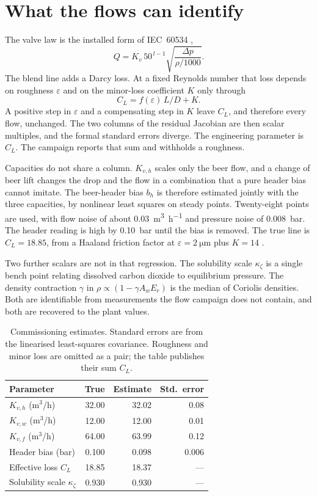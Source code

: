 \documentclass[11pt,a4paper]{article}
\begin{document}
\section{What the flows can identify}
The valve law is the installed form of IEC~60534 \citep{iec60534},
\begin{equation}
Q = K_v\,50^{\,l-1}\sqrt{\frac{\Delta p}{\rho/1000}}.
\end{equation}
The blend line adds a Darcy loss. At a fixed Reynolds number that loss depends on roughness $\varepsilon$ and on the minor-loss coefficient $K$ only through
\begin{equation}
C_L = f(\varepsilon)\,L/D + K.
\end{equation}
A positive step in $\varepsilon$ and a compensating step in $K$ leave $C_L$, and therefore every flow, unchanged. The two columns of the residual Jacobian are then scalar multiples, and the formal standard errors diverge. The engineering parameter is $C_L$. The campaign reports that sum and withholds a roughness.

Capacities do not share a column. $K_{v,h}$ scales only the beer flow, and a change of beer lift changes the drop and the flow in a combination that a pure header bias cannot imitate. The beer-header bias $b_h$ is therefore estimated jointly with the three capacities, by nonlinear least squares on steady points. Twenty-eight points are used, with flow noise of about \SI{0.03}{\cubic\metre\per\hour} and pressure noise of \SI{0.008}{bar}. The header reading is high by \SI{0.10}{bar} until the bias is removed. The true line is $C_L=18.85$, from a Haaland friction factor at $\varepsilon=\SI{2}{\micro\metre}$ plus $K=14$ \citep{crane2009}.

Two further scalars are not in that regression. The solubility scale $\kappa_\zeta$ is a single bench point relating dissolved carbon dioxide to equilibrium pressure. The density contraction $\gamma$ in $\rho\propto(1-\gamma A_w E_r)$ is the median of Coriolis densities. Both are identifiable from measurements the flow campaign does not contain, and both are recovered to the plant values.

\begin{table}[t]
\centering
\caption{Commissioning estimates. Standard errors are from the linearised least-squares covariance. Roughness and minor loss are omitted as a pair; the table publishes their sum $C_L$.}
\label{tab:est}
\begin{tabular}{lrrr}
\toprule
Parameter & True & Estimate & Std.\ error \\
\midrule
$K_{v,h}$ (m$^3$/h) & 32.00 & 32.02 & 0.08 \\
$K_{v,w}$ (m$^3$/h) & 12.00 & 12.00 & 0.01 \\
$K_{v,f}$ (m$^3$/h) & 64.00 & 63.99 & 0.12 \\
Header bias (bar) & 0.100 & 0.098 & 0.006 \\
Effective loss $C_L$ & 18.85 & 18.37 & --- \\
Solubility scale $\kappa_\zeta$ & 0.930 & 0.930 & --- \\
\bottomrule
\end{tabular}
\end{table}
\end{document}
